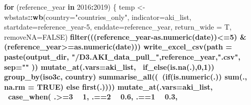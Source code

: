 \documentclass[]{article}
\newenvironment{Shaded}{\begin{snugshade}}{\end{snugshade}}
\newcommand{\CommentTok}[1]{\textcolor[rgb]{0.56,0.35,0.01}{\textit{#1}}}
\newcommand{\ControlFlowTok}[1]{\textcolor[rgb]{0.13,0.29,0.53}{\textbf{#1}}}
\newcommand{\DataTypeTok}[1]{\textcolor[rgb]{0.13,0.29,0.53}{#1}}
\newcommand{\DecValTok}[1]{\textcolor[rgb]{0.00,0.00,0.81}{#1}}
\newcommand{\FloatTok}[1]{\textcolor[rgb]{0.00,0.00,0.81}{#1}}
\newcommand{\KeywordTok}[1]{\textcolor[rgb]{0.13,0.29,0.53}{\textbf{#1}}}
\newcommand{\NormalTok}[1]{#1}
\newcommand{\OperatorTok}[1]{\textcolor[rgb]{0.81,0.36,0.00}{\textbf{#1}}}
\newcommand{\OtherTok}[1]{\textcolor[rgb]{0.56,0.35,0.01}{#1}}
\newcommand{\StringTok}[1]{\textcolor[rgb]{0.31,0.60,0.02}{#1}}
\begin{document}
\begin{Shaded}
\begin{Highlighting}[]
{{{{{{{{{{{{{\ControlFlowTok{for}\NormalTok{ (reference_year }\ControlFlowTok{in} \DecValTok{2016}\OperatorTok{:}\DecValTok{2019}\NormalTok{) \{}
\NormalTok{  temp <-wbstats}\OperatorTok{::}\KeywordTok{wb}\NormalTok{(}\DataTypeTok{country=}\StringTok{"countries_only"}\NormalTok{, }
              \DataTypeTok{indicator=}\NormalTok{aki_list,}
              \DataTypeTok{startdate=}\NormalTok{reference_year}\DecValTok{-5}\NormalTok{,}
              \DataTypeTok{enddate=}\NormalTok{reference_year,}
              \DataTypeTok{return_wide =}\NormalTok{ T,}
              \DataTypeTok{removeNA=}\OtherTok{FALSE}\NormalTok{) }\OperatorTok{%
\StringTok{          }\KeywordTok{filter}\NormalTok{(((reference_year}\OperatorTok{-}\KeywordTok{as.numeric}\NormalTok{(date))}\OperatorTok{<=}\DecValTok{5}\NormalTok{) }\OperatorTok{&}\StringTok{ }\NormalTok{(reference_year}\OperatorTok{>=}\KeywordTok{as.numeric}\NormalTok{(date))) }\OperatorTok{%
\StringTok{          }\KeywordTok{write_excel_csv}\NormalTok{(}\DataTypeTok{path =} \KeywordTok{paste}\NormalTok{(output_dir, }\StringTok{"/D3.AKI_data_pull_"}\NormalTok{,reference_year,}\StringTok{".csv"}\NormalTok{, }\DataTypeTok{sep=}\StringTok{""}\NormalTok{ )) }\OperatorTok{%
\StringTok{          }\KeywordTok{mutate_at}\NormalTok{(}\DataTypeTok{.vars=}\NormalTok{aki_list, }\OperatorTok{~}\KeywordTok{if_else}\NormalTok{(}\KeywordTok{is.na}\NormalTok{(.),}\DecValTok{0}\NormalTok{,}\DecValTok{1}\NormalTok{)) }\OperatorTok{%
\StringTok{          }\KeywordTok{group_by}\NormalTok{(iso3c, country) }\OperatorTok{%
\StringTok{          }\KeywordTok{summarise_all}\NormalTok{((}\OperatorTok{~}\NormalTok{(}\ControlFlowTok{if}\NormalTok{(}\KeywordTok{is.numeric}\NormalTok{(.)) }\KeywordTok{sum}\NormalTok{(., }\DataTypeTok{na.rm =} \OtherTok{TRUE}\NormalTok{) }\ControlFlowTok{else} \KeywordTok{first}\NormalTok{(.)))) }\OperatorTok{%
\StringTok{          }\KeywordTok{mutate_at}\NormalTok{(}\DataTypeTok{.vars=}\NormalTok{aki_list, }\OperatorTok{~}\KeywordTok{case_when}\NormalTok{(}
\NormalTok{            .}\OperatorTok{>=}\DecValTok{3} \OperatorTok{~}\StringTok{ }\DecValTok{1}\NormalTok{,}
\NormalTok{            .}\OperatorTok{==}\DecValTok{2} \OperatorTok{~}\StringTok{ }\FloatTok{0.6}\NormalTok{,}
\NormalTok{            .}\OperatorTok{==}\DecValTok{1} \OperatorTok{~}\StringTok{ }\FloatTok{0.3}\NormalTok{,}
}}}}}}}}}}}}}}}}}}}
\end{Highlighting}
\end{Shaded}
\end{document}
